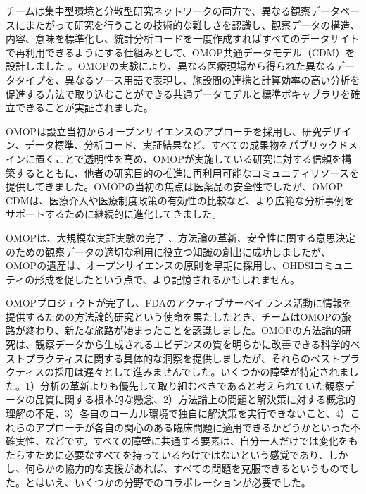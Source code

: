 \documentclass[
  11pt]{book}
\theoremstyle{definition}
\theoremstyle{definition}
\theoremstyle{definition}
\theoremstyle{definition}
\theoremstyle{remark}
\begin{document}
チームは集中型環境と分散型研究ネットワークの両方で、異なる観察データベースにまたがって研究を行うことの技術的な難しさを認識し、観察データの構造、内容、意味を標準化し、統計分析コードを一度作成すればすべてのデータサイトで再利用できるようにする仕組みとして、OMOP共通データモデル（CDM）を設計しました \citep{overhage2012cdm} 。OMOPの実験により、異なる医療現場から得られた異なるデータタイプを、異なるソース用語で表現し、施設間の連携と計算効率の高い分析を促進する方法で取り込むことができる共通データモデルと標準ボキャブラリを確立できることが実証されました。

OMOPは設立当初からオープンサイエンスのアプローチを採用し、研究デザイン、データ標準、分析コード、実証結果など、すべての成果物をパブリックドメインに置くことで透明性を高め、OMOPが実施している研究に対する信頼を構築するとともに、他者の研究目的の推進に再利用可能なコミュニティリソースを提供してきました。OMOPの当初の焦点は医薬品の安全性でしたが、OMOP CDMは、医療介入や医療制度政策の有効性の比較など、より広範な分析事例をサポートするために継続的に進化してきました。

OMOPは、大規模な実証実験の完了\citep{ryan2012omop, ryan2013omop} 、方法論の革新\citep{schuemie_2014}、安全性に関する意思決定のための観察データの適切な利用に役立つ知識の創出\citep{madigan_2013, madigan2013design}に成功しましたが、OMOPの遺産は、オープンサイエンスの原則を早期に採用し、OHDSIコミュニティの形成を促したという点で、より記憶されるかもしれません。

OMOPプロジェクトが完了し、FDAのアクティブサーベイランス活動に情報を提供するための方法論的研究という使命を果たしたとき、チームはOMOPの旅路が終わり、新たな旅路が始まったことを認識しました。OMOPの方法論的研究は、観察データから生成されるエビデンスの質を明らかに改善できる科学的ベストプラクティスに関する具体的な洞察を提供しましたが、それらのベストプラクティスの採用は遅々として進みませんでした。いくつかの障壁が特定されました。1）分析の革新よりも優先して取り組むべきであると考えられていた観察データの品質に関する根本的な懸念、2）方法論上の問題と解決策に対する概念的理解の不足、3）各自のローカル環境で独自に解決策を実行できないこと、4）これらのアプローチが各自の関心のある臨床問題に適用できるかどうかといった不確実性、などです。すべての障壁に共通する要素は、自分一人だけでは変化をもたらすために必要なすべてを持っているわけではないという感覚であり、しかし、何らかの協力的な支援があれば、すべての問題を克服できるというものでした。とはいえ、いくつかの分野でのコラボレーションが必要でした。
\end{document}
